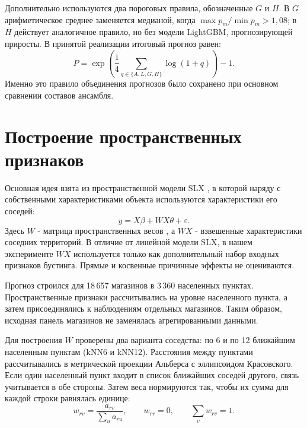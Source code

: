 \documentclass[12pt, a4paper]{article}
\begin{document}
Дополнительно используются два пороговых правила, обозначенные $G$ и $H$. В $G$
арифметическое среднее заменяется медианой, когда $\max p_m/\min p_m>1{,}08$; в $H$ действует аналогичное правило,
но без модели LightGBM, прогнозирующей приросты. В принятой реализации итоговый прогноз равен:
\begin{equation}
P=\exp\left(\frac14\sum_{q\in\{A,L,G,H\}}\log(1+q)\right)-1.
\label{eq:meta}
\end{equation}
Именно это правило объединения прогнозов было сохранено при основном сравнении составов ансамбля.

\clearpage

\section*{Построение пространственных признаков}

Основная идея взята из пространственной модели SLX \cite{vega2015}, в которой наряду с собственными характеристиками объекта используются характеристики его соседей:
\begin{equation}
y=X\beta+WX\theta+\varepsilon.
\end{equation}
Здесь $W$ - матрица пространственных весов \cite{lesage2009}, а $WX$ - взвешенные характеристики соседних территорий. В отличие от линейной модели SLX,
в нашем эксперименте $WX$ используется только как дополнительный набор входных признаков бустинга.
Прямые и косвенные причинные эффекты не оцениваются.

Прогноз строился для 18\,657 магазинов в 3\,360 населенных пунктах.
Пространственные признаки рассчитывались на уровне населенного пункта, а затем присоединялись к наблюдениям отдельных магазинов.
Таким образом, исходная панель магазинов не заменялась агрегированными данными.

Для построения $W$ проверены два варианта соседства: по 6 и по 12 ближайшим населенным пунктам (kNN6 и kNN12).
Расстояния между пунктами рассчитывались в метрической проекции Альберса с эллипсоидом Красовского.
Если один населенный пункт входит в список ближайших соседей другого, связь учитывается в обе стороны.
Затем веса нормируются так, чтобы их сумма для каждой строки равнялась единице:
\begin{equation}
w_{rv}=\frac{a_{rv}}{\sum_u a_{ru}}, \qquad w_{rr}=0,\qquad \sum_v w_{rv}=1.
\end{equation}
\end{document}
